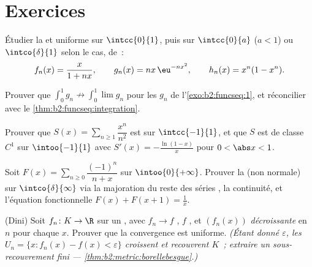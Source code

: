\section{Exercices}

\begin{exercise}[$\star$]\label{exo:b2:funcseq:1}
Étudier la  et uniforme sur $\intcc{0}{1}$, puis
sur $\intcc{0}{a}$ ($a < 1$) ou $\intco{\delta}{1}$ selon le cas, de~:
\[
f_n(x) = \frac{x}{1 + nx},
\qquad
g_n(x) = n x\,\eu^{-n x^2},
\qquad
h_n(x) = x^n(1 - x^n).
\]
\end{exercise}

\begin{exercise}[$\star$]\label{exo:b2:funcseq:2}
Prouver que $\displaystyle\int_0^1 g_n \not\to \int_0^1 \lim g_n$
pour les $g_n$ de l'\cref{exo:b2:funcseq:1}, et réconcilier avec le
\cref{thm:b2:funcseq:integration}.
\end{exercise}

\begin{exercise}[$\star$]\label{exo:b2:funcseq:3}
Prouver que $S(x) = \sum_{n\geq1} \dfrac{x^n}{n^2}$ est  sur
$\intcc{-1}{1}$, et que $S$ est de classe $C^1$ sur $\intoo{-1}{1}$
avec $S'(x) = -\frac{\ln(1-x)}{x}$ pour $0 < \abs x < 1$.
\end{exercise}

\begin{exercise}[$\star\star$]\label{exo:b2:funcseq:4}
Soit $F(x) = \sum_{n \geq 0} \dfrac{(-1)^n}{n + x}$ sur
$\intoo{0}{+\infty}$. Prouver la  (non normale)
sur $\intco{\delta}{\infty}$ via la majoration du reste des séries
, la continuité, et l'équation fonctionnelle $F(x) + F(x + 1) =
\frac1x$.
\end{exercise}

\begin{exercise}[$\star\star$]\label{exo:b2:funcseq:5}
(Dini) Soit $f_n \colon K \to \R$  sur un 
\emph{}, avec $f_n \to f$ \emph{}, $f$ ,
et $(f_n(x))$ \emph{décroissante} en $n$ pour chaque $x$. Prouver que
la convergence est uniforme. \emph{(Étant donné $\varepsilon$, les
 $U_n = \{x : f_n(x) - f(x) < \varepsilon\}$ croissent et
recouvrent $K$~; extraire un sous-recouvrement fini ---
\cref{thm:b2:metric:borellebesgue}.)}
\end{exercise}

